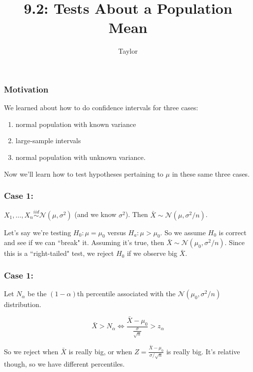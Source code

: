 \documentclass{beamer}
\title["9.2"]{9.2: Tests About a Population Mean}
\author{Taylor}
\institute[UVA] 
{
University of Virginia \\
\medskip
\textit{} 
}
\date{}
\begin{document}

\begin{frame}
\titlepage 
\end{frame}

\begin{frame}
\frametitle{Motivation}

We learned about how to do confidence intervals for three cases:
\begin{enumerate}
\item normal population with known variance
\item large-sample intervals
\item normal population with unknown variance.
\end{enumerate}

Now we'll learn how to test hypotheses pertaining to $\mu$ in these same three cases.
\end{frame}


\begin{frame}
\frametitle{Case 1:}

 $X_1, \ldots, X_n \overset{iid}{\sim} \mathcal{N}(\mu, \sigma^2)$ (and we know $\sigma^2$). Then $\bar{X} \sim \mathcal{N}(\mu, \sigma^2/n)$.
\newline

Let's say we're testing $H_0: \mu = \mu_0$ versus $H_a: \mu > \mu_0$. So we assume $H_0$ is correct and see if we can ``break" it. Assuming it's true, then $\bar{X} \sim \mathcal{N}(\mu_0, \sigma^2/n)$. Since this is a ``right-tailed" test, we reject $H_0$ if we observe big $\bar{X}$. 
\newline


\end{frame}


\begin{frame}
\frametitle{Case 1:}

Let $N_{\alpha}$ be the $(1-\alpha)$th percentile associated with the $\mathcal{N}(\mu_0, \sigma^2/n)$ distribution. 

\[
\bar{X} > N_{\alpha} \iff \frac{\bar{X} - \mu_0}{\frac{\sigma}{\sqrt{n}}} > z_{\alpha}
\]

So we reject when $\bar{X}$ is really big, or when $Z = \frac{\bar{X}-\mu_0}{\sigma/ \sqrt{n}}$ is really big. It's relative though, so we have different percentiles.
\end{frame}
\end{document}
